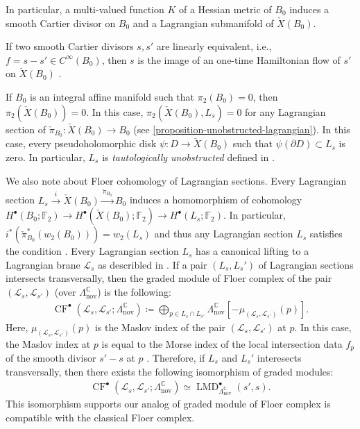 \documentclass[a4paper,dvipdfmx,reqno,12pt]{amsart}
\theoremstyle{definition}
\newcommand{\deq}{\coloneqq}
\newcommand{\opn}[1]{\operatorname{#1}}
\newcommand{\xto}[1]{\xrightarrow{#1}}
\numberwithin{equation}{section}
\begin{document}
In particular, a multi-valued function $K$ of a Hessian 
metric of $B_0$ induces a smooth Cartier divisor on $B_0$
and a Lagrangian submanifold of $\check{X}(B_0)$.

If two smooth Cartier divisors $s,s'$ are linearly equivalent, 
i.e., $f=s-s'\in C^{\infty}(B_0)$, 
then $s$ is the image of an one-time Hamiltonian flow of $s'$
on $\check{X}(B_0)$
\cite[Exercise 6.65]{MR2567952}.

If $B_0$ is an integral affine manifold such 
that $\pi_2(B_0)=0$, then $\pi_2(\check{X}(B_0))=0$.
In this case, $\pi_2(\check{X}(B_0),L_s)=0$ for 
any Lagrangian section of 
$\check{\pi}_{B_0}\colon \check{X}(B_0)\to B_0$
(see \cref{proposition-unobstructed-lagrangian}).
In this case, every 
pseudoholomorphic disk 
$\psi\colon D\to \check{X}(B_0)$ such that 
$\psi(\partial D)\subset L_s$ is zero.
In particular, $L_s$ is 
\emph{tautologically unobstructed} defined in
\cite[(2.50)]{MR3656481}.

We also note about Floer cohomology of 
Lagrangian sections.
Every Lagrangian section
$L_s\xto{i} \check{X}(B_0)\xto{\check{\pi}_{B_0}}  B_0$
induces a homomorphism of 
cohomology 
$H^{\bullet}(B_0;\mathbb{F}_2)\to 
H^{\bullet}(\check{X}(B_0);\mathbb{F}_2)
\to 
H^{\bullet}(L_s;\mathbb{F}_2)$.
In particular, 
$i^{*}(\check{\pi}_{B_0}^{*}(w_2(B_0)))=w_2(L_s)$ and 
thus any Lagrangian section $L_s$ satisfies the 
condition \cite[(2.54)]{MR3656481}.
Every Lagrangian section $L_s$ has 
a canonical lifting to a Lagrangian 
brane $\mathscr{L}_s$ as describled in 
\cite[5.2]{MR1882331}.
If a pair $(L_s,L_s')$ of Lagrangian sections 
intersects transversally, then the graded 
module of Floer complex of the pair
$(\mathscr{L}_s,\mathscr{L}_{s'})$
(over $\Lambda_{\opn{nov}}^{\mathbb{C}}$) 
is the following:
\begin{align}
\opn{CF}^{\bullet}(\mathscr{L}_s,\mathscr{L}_{s'};
\Lambda_{\opn{nov}}^{\mathbb{C}})
\deq \bigoplus_{p\in L_s\cap L_{s'}}
\Lambda_{\opn{nov}}^{\mathbb{C}}
[-\mu_{(\mathscr{L}_s,\mathscr{L}_{s'})}(p)].
\end{align}
Here, $\mu_{(\mathscr{L}_s,\mathscr{L}_{s'})}(p)$ is 
the Maslov index of the pair 
$(\mathscr{L}_s,\mathscr{L}_{s'})$ at $p$.
In this case, the Maslov index at $p$
is equal to the Morse index of the 
local intersection data $f_{p}$ of 
the smooth divisor $s'-s$ at $p$
\cite[Remark 13]{MR1882331}. Therefore, 
if $L_s$ and $L_s'$ interesects 
transversally, then there exists the following
isomorphism of graded modules:
\begin{align}
\opn{CF}^{\bullet}(\mathscr{L}_s,\mathscr{L}_{s'};
\Lambda_{\opn{nov}}^{\mathbb{C}})
\simeq 
\opn{LMD}^{\bullet}_{\Lambda_{\opn{nov}}^{\mathbb{C}}}
(s',s).
\end{align}
This isomorphism supports our analog of graded module
of Floer complex is compatible with the classical 
Floer complex.
\end{document}
